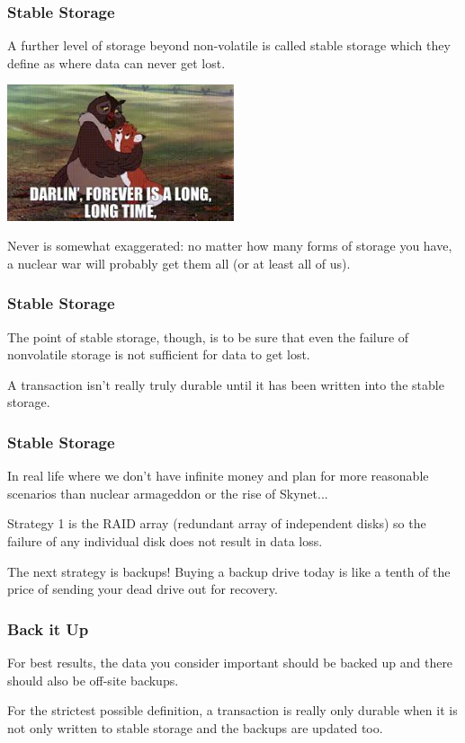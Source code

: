 \begin{frame}
\frametitle{Stable Storage}

A further level of storage beyond non-volatile is called \alert{stable storage} which they define as where data can never get lost. 

\begin{center}
	\includegraphics[width=0.5\textwidth]{images/forever.jpg}
\end{center}

Never is somewhat exaggerated: no matter how many forms of storage you have, a nuclear war will probably get them all (or at least all of us). 

\end{frame}


\begin{frame}
\frametitle{Stable Storage}

The point of stable storage, though, is to be sure that even the failure of nonvolatile storage is not sufficient for data to get lost.

A transaction isn't really truly durable until it has been written into the stable storage.


\end{frame}

\begin{frame}
\frametitle{Stable Storage}
In real life where we don't have infinite money and plan for more reasonable scenarios than nuclear armageddon or the rise of Skynet...

Strategy 1 is the RAID array (redundant array of independent disks) so the failure of any individual disk does not result in data loss. 

The next strategy is backups! Buying a backup drive today is like a tenth of the price of sending your dead drive out for recovery. 

\end{frame}

\begin{frame}
\frametitle{Back it Up}

For best results, the data you consider important should be backed up and there should also be off-site backups. 


For the strictest possible definition, a transaction is really only durable when it is not only written to stable storage and the backups are updated too.

\end{frame}


